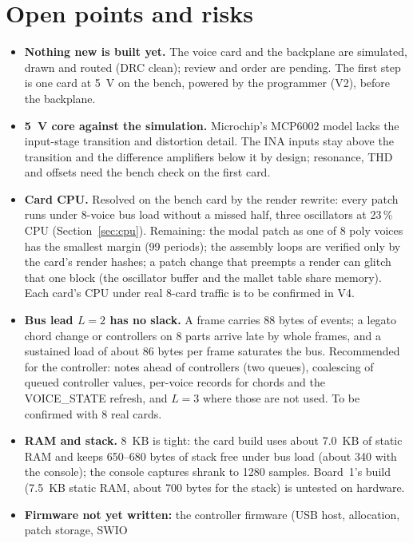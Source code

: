 \documentclass[11pt,a4paper]{article}
\begin{document}
\section{Open points and risks}\label{sec:open}
\begin{itemize}
  \item \textbf{Nothing new is built yet.} The voice card and the backplane are simulated, drawn and routed (DRC clean);
    review and order are pending. The first step is one card at \SI{5}{V} on the bench, powered by the programmer (V2),
    before the backplane.
  \item \textbf{\SI{5}{V} core against the simulation.} Microchip's MCP6002 model lacks the input-stage transition and
    distortion detail. The INA inputs stay above the transition and the difference amplifiers below it by design;
    resonance, THD and offsets need the bench check on the first card.
  \item \textbf{Card CPU.} Resolved on the bench card by the render rewrite: every patch runs under 8-voice bus load
    without a missed half, three oscillators at 23\,\% CPU (Section~\ref{sec:cpu}). Remaining: the modal patch as one
    of 8 poly voices has the smallest margin (99 periods); the assembly loops are verified only by the card's render
    hashes; a patch change that preempts a render can glitch that one block (the oscillator buffer and the mallet table
    share memory). Each card's CPU under real 8-card traffic is to be confirmed in V4.
  \item \textbf{Bus lead $L = 2$ has no slack.} A frame carries 88 bytes of events; a legato chord change or
    controllers on 8 parts arrive late by whole frames, and a sustained load of about 86 bytes per frame saturates the
    bus. Recommended for the controller: notes ahead of controllers (two queues), coalescing of queued controller
    values, per-voice records for chords and the VOICE\_STATE refresh, and $L = 3$ where those are not used. To be
    confirmed with 8 real cards.
  \item \textbf{RAM and stack.} \SI{8}{KB} is tight: the card build uses about \SI{7.0}{KB} of static RAM and keeps
    650--680 bytes of stack free under bus load (about 340 with the console); the console captures shrank to 1280
    samples. Board~1's build (\SI{7.5}{KB} static RAM, about 700 bytes for the stack) is untested on hardware.
  \item \textbf{Firmware not yet written:} the controller firmware (USB host, allocation, patch storage, SWIO

\end{itemize}
\end{document}
